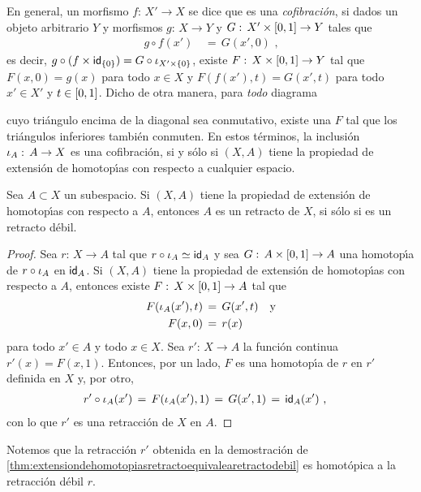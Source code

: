En general, un morfismo $f:\,X'\rightarrow X$ se dice que es una
\emph{cofibraci\'{o}n}, si dados un objeto arbitrario $Y$ y morfismos
$g:\,X\rightarrow Y$ y $G:\,X'\times\intervalo\rightarrow Y$ tales que
\begin{align*}
	g\circ f(x') & \,=\,G(x',0)
	\text{ ,}
\end{align*}
%
es decir, $g\circ (f\times\id[\{0\}])=G\circ\inc[X'\times\{0\}]$, existe
$F:\,X\times\intervalo\rightarrow Y$ tal que $F(x,0)=g(x)$ para todo
$x\in X$ y $F(f(x'),t)=G(x',t)$ para todo $x'\in X'$ y $t\in\intervalo$.
Dicho de otra manera, para \emph{todo} diagrama
\begin{center}
\end{center}
cuyo tri\'{a}ngulo encima de la diagonal sea conmutativo, existe una
$F$ tal que los tri\'{a}ngulos inferiores tambi\'{e}n conmuten. En estos
t\'{e}rminos, la inclusi\'{o}n $\inc[A]:\,A\rightarrow X$ es una
cofibraci\'{o}n, si y s\'{o}lo si $(X,A)$ tiene la propiedad de extensi\'{o}n
de homotop\'{\i}as con respecto a cualquier espacio.

\begin{teoExtensionDeHomotopiasRetractoEquivaleARetractoDebil}%
	\label{thm:extensiondehomotopiasretractoequivalearetractodebil}
	Sea $A\subset X$ un subespacio. Si $(X,A)$ tiene la propiedad de
	extensi\'{o}n de homotop\'{\i}as con respecto a $A$, entonces
	$A$ es un retracto de $X$, si s\'{o}lo si es un retracto d\'{e}bil.
\end{teoExtensionDeHomotopiasRetractoEquivaleARetractoDebil}

\begin{proof}
	Sea $r:\,X\rightarrow A$ tal que $r\circ\inc[A]\simeq\id[A]$ y sea
	$G:\,A\times\intervalo\rightarrow A$ una homotop\'{\i}a de
	$r\circ\inc[A]$ en $\id[A]$. Si $(X,A)$ tiene la propiedad de
	extensi\'{o}n de homotop\'{\i}as con respecto a $A$, entonces
	existe $F:\,X\times\intervalo\rightarrow A$ tal que
	\begin{align*}
		F(\inc[A](x'),t) & \,=\,G(x',t) \quad\text{y} \\
		F(x,0) & \,=\,r(x)
	\end{align*}
	para todo $x'\in A$ y todo $x\in X$. Sea $r':\,X\rightarrow A$
	la funci\'{o}n continua $r'(x)=F(x,1)$. Entonces, por un lado, $F$ es
	una homotop\'{\i}a de $r$ en $r'$ definida en $X$ y, por otro,
	\begin{align*}
		r'\circ\inc[A](x') & \,=\, F(\inc[A](x'),1)
			\,=\, G(x',1) \,=\,\id[A](x')
		\text{ ,}
	\end{align*}
	con lo que $r'$ es una retracci\'{o}n de $X$ en $A$.
\end{proof}

Notemos que la retracci\'{o}n $r'$ obtenida en la demostraci\'{o}n de
\ref{thm:extensiondehomotopiasretractoequivalearetractodebil} es homot\'{o}pica
a la retracci\'{o}n d\'{e}bil $r$.
